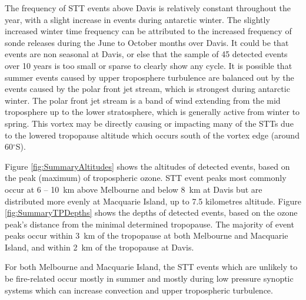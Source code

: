 \documentclass{article}
\begin{document}
  The frequency of STT events above Davis is relatively constant throughout the year, with a slight increase in events during antarctic winter.
  The slightly increased winter time frequency can be attributed to the increased frequency of sonde releases during the June to October months over Davis.
  It could be that events are non seasonal at Davis, or else that the sample of 45 detected events over 10 years is too small or sparse to clearly show any cycle.
  It is possible that summer events caused by upper troposphere turbulence are balanced out by the events caused by the polar front jet stream, which is strongest during antarctic winter.
  The polar front jet stream is a band of wind extending from the mid troposphere up to the lower stratosphere, which is generally active from winter to spring. 
  This vortex may be directly causing or impacting many of the STTs due to the lowered tropopause altitude which occurs south of the vortex edge (around 60$^\circ$S).

  Figure \ref{fig:SummaryAltitudes} shows the altitudes of detected events, based on the peak (maximum) of tropospheric ozone.
  STT event peaks most commonly occur at 6 -- 10~km above Melbourne and below 8~km at Davis but are distributed more evenly at Macquarie Island, up to 7.5 kilometres altitude.
  Figure \ref{fig:SummaryTPDepths} shows the depths of detected events, based on the ozone peak's distance from the minimal determined tropopause.
  The majority of event peaks occur within 3~km of the tropopause at both Melbourne and Macquarie Island, and within 2~km of the tropopause at Davis.
  
  For both Melbourne and Macquarie Island, the STT events which are unlikely to be fire-related occur mostly in summer and mostly during low pressure synoptic systems which can increase convection and upper tropospheric turbulence.
\end{document}
